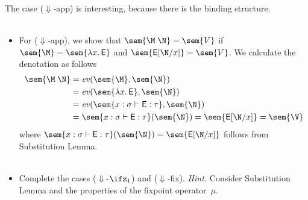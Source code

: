 \begin{frame}
  The case ($\Downarrow$-app) is interesting, because there is
  the binding structure.
  \\~\\
  \begin{itemize}
      \item For ($\Downarrow$-app), we show that $\sem{\M\;\N} = \sem{V}$
        if $\sem{\M} = \sem{\lambda x.\, \mathsf{E}}$ and $\sem{\mathsf{E}[\N/x]} =
        \sem{V}$. We calculate the denotation as follows
        \begin{align*}
          \sem{\M\;\N} & = \mathit{ev}(\sem{\M}, \sem{\N}) \\
          & = \mathit{ev}(\sem{\lambda x.\, \mathsf{E}}, 
          \sem{\N}) \\
          & = \mathit{ev}(\sem{x : \sigma \vdash \mathsf{E} : \tau},
          \sem{\N}) \\
          & = \sem{x : \sigma \vdash \mathsf{E} : \tau}(\sem{\N})
          = \sem{\mathsf{E}[\N/x]} = \sem{\V}
        \end{align*}
        where $\sem{x : \sigma \vdash \mathsf{E} : \tau}(\sem{\N}) =
        \sem{\mathsf{E}[\N/x]}$ follows from Substitution Lemma.
        \\~\\
      \item Complete the cases ($\Downarrow$-$\ifz_1$) and ($\Downarrow$-fix).
        {\small \emph{Hint.} Consider Substitution Lemma and
        the properties of the fixpoint operator~$\mu$.}
    \end{itemize}
\end{frame}

